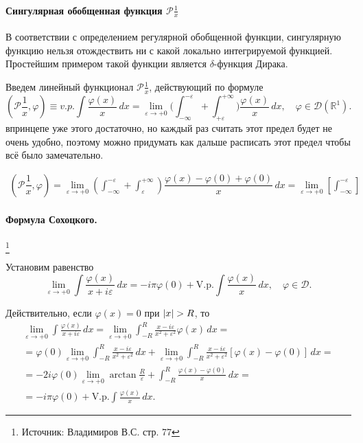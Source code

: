 \paragraph{Сингулярная обобщенная функция $\mathcal{P}{\frac{1}{x}}$}

В соответствии с определением регулярной обобщенной функции, сингулярную функцию нельзя отождествить ни с какой локально интегрируемой функцией. Простейшим примером такой функции является $\delta$-функция Дирака.

Введем линейный функционал $\mathcal{P}{\frac{1}{x}}$, действующий по формуле
\begin{equation*}
	(\mathcal{P}{\frac{1}{x}}, \varphi)
  \equiv v.p. \int \frac{\varphi(x)}{x} \, dx
  = \lim \limits_{\varepsilon \to +0} \Big(\int_{-\infty}^{-\varepsilon} + \int_{+\varepsilon}^{+\infty}\Big) \frac{\varphi(x)}{x} \, dx, \quad \varphi \in \mathcal{D}(\mathbb{R}^1).
\end{equation*}
впринцепе уже этого достаточно, но каждый раз считать этот предел будет не очень удобно, поэтому
можно придумать как дальше расписать этот предел чтобы всё было замечательно.

\begin{multline*}
  (\mathcal{P} \dfrac{1}{x}, \varphi)
  = \lim_{\varepsilon\to+0} \left(\int_{-\infty}^{-\varepsilon} + \int_{\varepsilon}^{+\infty}\right)
    \dfrac{\varphi(x) - \varphi(0) + \varphi(0)}{x} \, dx
    = \lim_{\varepsilon\to+0} \left[ \int_{-\infty}^{-\varepsilon}  \right] 
\end{multline*}

\paragraph{Формула Сохоцкого.}\footnote{Источник: Владимиров В.С. стр. 77}

Установим равенство
\begin{equation}
	\label{huinya_s_potolka}
	\lim \limits_{\varepsilon \to +0} \int \frac{\varphi(x)}{x + i \varepsilon} \, dx = - i \pi \varphi(0) + \text{V.p.} \int \frac{\varphi(x)}{x} \, dx, \quad \varphi \in \mathcal{D}.
\end{equation}

Действительно, если $\varphi(x) = 0$ при $\abs{x} > R$, то 
\begin{align*}
	\lim \limits_{\varepsilon \to +0} \int \frac{\varphi(x)}{x + i \varepsilon} \, dx = \lim \limits_{\varepsilon \to +0} \int_{-R}^{R} \frac{x - i \varepsilon}{x^2 + \varepsilon^2} \varphi(x) \, dx = \\
	= \varphi(0) \lim \limits_{\varepsilon \to +0} \int_{-R}^{R} \frac{x - i \varepsilon}{x^2 + \varepsilon^2} \, dx + \lim \limits_{\varepsilon \to +0} \int_{-R}^{R} \frac{x - i \varepsilon}{x^2 + \varepsilon^2} [\varphi(x) - \varphi(0)] \, dx = \\
	= - 2 i \varphi(0) \lim \limits_{\varepsilon \to +0} \arctan{\frac{R}{\varepsilon}} + \int_{-R}^{R} \frac{\varphi(x) - \varphi(0)}{x} \, dx = \\
	= - i \pi \varphi(0) + \text{V.p.} \int \frac{\varphi(x)}{x} \, dx.
\end{align*}

